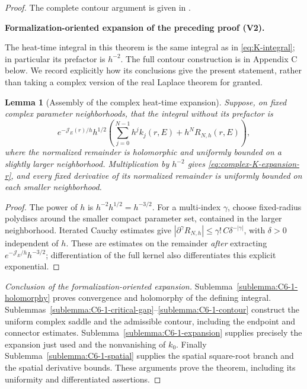 \documentclass[11pt]{article}
\newtheorem{lemma}[theorem]{Lemma}
\newcommand{\formalisationparentid}{X}
\newenvironment{formalisationaddition}[1]{\par\medskip\begingroup\color{blue}\def\formalisationparentid{#1}\setcounter{formalizationsublemma}{0}\let\lemma\formalizationsublemma\let\endlemma\endformalizationsublemma
  \def\Eo{\mathcal E_h^\circ}\def\EE{\mathcal E_h}\def\phio{\phi_h^\circ}\def\phih{\phi_h}\def\Ho{H_h^{\rm atom}(v^\circ)}\def\Ha{H_h^{\rm atom}}\def\HL{H_h^{L}}\def\Dh{D_h}\def\Log{\operatorname{Log}}\def\ellh{\ell_h}\def\Gp{G_{p,h}}\def\Ast{A_{*,h}}\def\ahat{\widehat{\mathfrak a}_h}\def\ah{\mathfrak a_h}\def\rh{\widehat\rho_h}\def\deltah{\widehat\delta_h}\def\oldref##1{\textup{(##1)}}\def\interface##1{\par\noindent\textit{Analytical interface used here.} ##1\par}\def\finish{\par\noindent\textit{Conclusion of the formalization-oriented expansion.} }\par\noindent\textbf{Formalization-oriented expansion of the preceding proof (V2).}\par\smallskip
}{\par\endgroup\medskip
}
\newcommand{\cJ}{\mathcal J}
\begin{document}
\begin{proof}
The complete contour argument is given in
.

\begin{formalisationaddition}{T6.1}
The heat-time integral in this theorem is the same integral as in \eqref{eq:K-integral}; in particular its prefactor is $h^{-2}$. The full contour construction is in Appendix C below. We record explicitly how its conclusions give the present statement, rather than taking a complex version of the real Laplace theorem for granted.

\begin{lemma}[Assembly of the complex heat-time expansion]\label{sublemma:T6-1-assembly}
Suppose, on fixed complex parameter neighborhoods, that the integral without its prefactor is
\[
 e^{-\cJ_E(r)/h}h^{1/2}\left(\sum_{j=0}^{N-1}h^jk_j(r,E)+h^NR_{N,h}(r,E)\right),
\]
where the normalized remainder is holomorphic and uniformly bounded on a slightly larger neighborhood. Multiplication by $h^{-2}$ gives \eqref{eq:complex-K-expansion-r}, and every fixed derivative of its normalized remainder is uniformly bounded on each smaller neighborhood.
\end{lemma}
\begin{proof}
The power of $h$ is $h^{-2}h^{1/2}=h^{-3/2}$. For a multi-index $\gamma$, choose fixed-radius polydiscs around the smaller compact parameter set, contained in the larger neighborhood. Iterated Cauchy estimates give $|\partial^\gamma R_{N,h}|\le \gamma!\,C\delta^{-|\gamma|}$, with $\delta>0$ independent of $h$. These are estimates on the remainder \emph{after} extracting $e^{-\cJ_E/h}h^{-3/2}$; differentiation of the full kernel also differentiates this explicit exponential.
\end{proof}

\finish Sublemma~\ref{sublemma:C6-1-holomorphy} proves convergence and holomorphy of the defining integral. Sublemmas~\ref{sublemma:C6-1-critical-gap}--\ref{sublemma:C6-1-contour} construct the uniform complex saddle and the admissible contour, including the endpoint and connector estimates. Sublemma~\ref{sublemma:C6-1-expansion} supplies precisely the expansion just used and the nonvanishing of $k_0$. Finally Sublemma~\ref{sublemma:C6-1-spatial} supplies the spatial square-root branch and the spatial derivative bounds. These arguments prove the theorem, including its uniformity and differentiated assertions.
\end{formalisationaddition}

\end{proof}
\end{document}
